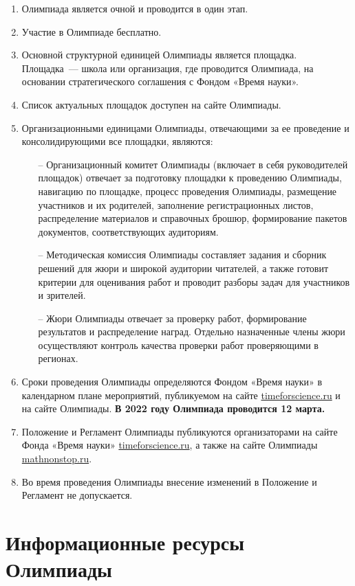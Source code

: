 \documentclass[a4paper,12pt]{article}
\newcommand{\surl}[1]{{\small\url{#1}}}
\begin{document}
\begin{enumerate}
	\item Олимпиада является очной и проводится в один этап.
	\item Участие в Олимпиаде бесплатно.
	\item Основной структурной единицей Олимпиады является площадка. Площадка~— школа или организация, где проводится Олимпиада, на основании стратегического соглашения с Фондом «Время науки».
	\item Список актуальных площадок доступен на сайте Олимпиады.
	\item Организационными единицами Олимпиады, отвечающими за ее проведение и консолидирующими все площадки, являются: \begin{enumerate}
	   \item[–] Организационный комитет Олимпиады (включает в себя руководителей площадок) отвечает за подготовку площадки к проведению Олимпиады, навигацию по площадке, процесс проведения Олимпиады, размещение участников и их родителей, заполнение регистрационных листов, распределение материалов и справочных брошюр, формирование пакетов документов, соответствующих аудиториям.
	   \item[–] Методическая комиссия Олимпиады составляет задания и сборник решений для жюри и широкой аудитории читателей, а также готовит критерии для оценивания работ и проводит разборы задач для участников и зрителей.
	   \item[–] Жюри Олимпиады отвечает за проверку работ, формирование результатов и распределение наград. Отдельно назначенные члены жюри осуществляют контроль качества проверки работ проверяющими в регионах.
   \end{enumerate}
	\item Сроки проведения Олимпиады определяются Фондом «Время науки» в календарном плане мероприятий, публикуемом на сайте \surl{timeforscience.ru} и на сайте Олимпиады. {\bf В 2022 году Олимпиада проводится 12 марта.}
	\item Положение и Регламент Олимпиады публикуются организаторами на сайте Фонда «Время науки» \surl{timeforscience.ru}, а также на сайте Олимпиады \surl{mathnonstop.ru}.
	\item Во время проведения Олимпиады внесение изменений в Положение и Регламент не допускается.
\end{enumerate}

\section{Информационные ресурсы Олимпиады}
\end{document}

